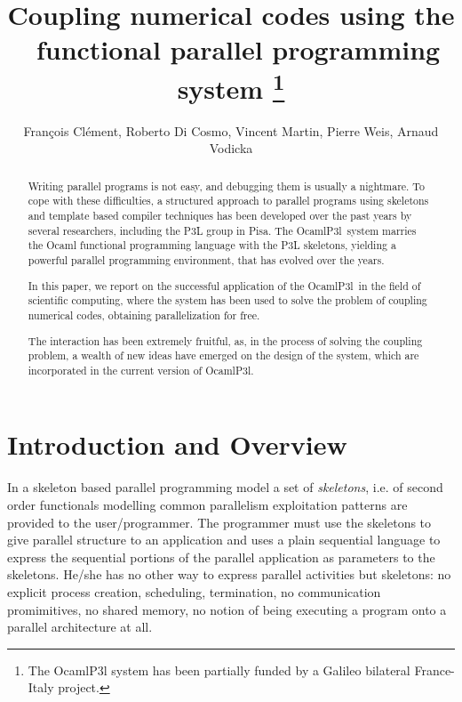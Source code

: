 \documentclass{article}
\title{Coupling numerical codes using the \ocamlpiiil\ functional parallel programming system
       \thanks{The OcamlP3l system has been partially funded by a Galileo bilateral France-Italy project. }}
\author{Fran\c{c}ois Cl\'ement, Roberto Di Cosmo, Vincent Martin, Pierre Weis, Arnaud Vodicka}
\newcommand{\ocamlpiiil}{{\sf OcamlP3l}}
\begin{document}
\maketitle

\begin{abstract}
  Writing parallel programs is not easy, and debugging them is usually
  a nightmare.  To cope with these difficulties, a structured approach
  to parallel programs using skeletons and template based compiler
  techniques has been developed over the past years by several
  researchers, including the P3L group in Pisa. The \ocamlpiiil\ 
  system marries the Ocaml functional programming language with the
  P3L skeletons, yielding a powerful parallel programming environment,
  that has evolved over the years.

  In this paper, we report on the successful application of the \ocamlpiiil\
  in the field of scientific computing, where the system has been used to 
  solve the problem of coupling numerical codes, obtaining parallelization
  for free.

  The interaction has been extremely fruitful, as, in the process of solving the
  coupling problem, a wealth of new ideas have emerged on the design of the
  system, which are incorporated in the current version of  \ocamlpiiil.

\end{abstract}

\section{Introduction and Overview}

In a skeleton based parallel programming model 
\cite{cole-th,ic-parle-93-1,fgcs-firenze} a set of \textit{skeletons},
i.e. of second order functionals modelling common parallelism
exploitation patterns are provided to the user/programmer. The
programmer must use the skeletons to give parallel structure to
an application and  uses a plain sequential language to
express the sequential portions of the parallel application as
parameters to the skeletons. He/she has no other way to express
parallel activities but skeletons: no explicit process creation,
scheduling, termination, no communication promimitives, no shared
memory, no notion of being executing a program onto a parallel
architecture at all.
\end{document}
